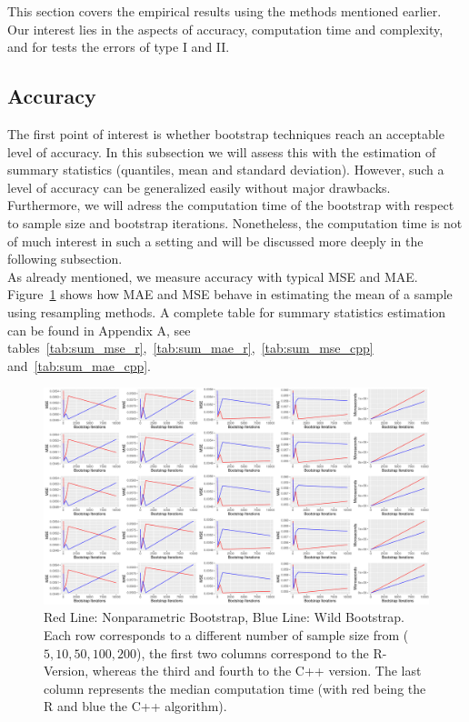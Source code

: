 This section covers the empirical results using the methods mentioned earlier. Our interest lies in the aspects of accuracy, computation time and complexity, and for tests the errors of type I and II. 
\subsection{Accuracy}
The first point of interest is whether bootstrap techniques reach an acceptable level of accuracy. In this subsection we will assess this with the estimation of summary statistics (quantiles, mean and standard deviation). However, such a level of accuracy can be generalized easily without major drawbacks. Furthermore, we will adress the computation time of the bootstrap with respect to sample size and bootstrap iterations. Nonetheless, the computation time is not of much interest in such a setting and will be discussed more deeply in the following subsection. \\
As already mentioned, we measure accuracy with typical MSE and MAE. Figure~\ref{fig:summary} shows how MAE and MSE behave in estimating the mean of a sample using resampling methods. A complete table for summary statistics estimation can be found in Appendix A, see tables~\ref{tab:sum_mse_r},~\ref{tab:sum_mae_r},~\ref{tab:sum_mse_cpp} and~\ref{tab:sum_mae_cpp}. 

\begin{figure}
\centering
	\includegraphics[scale=0.4]{./figures/plot_summary.pdf}
	\caption[Summary MSE and MAE]{Red Line: Nonparametric Bootstrap, Blue Line: Wild Bootstrap. Each row corresponds to a different number of sample size from ($5, 10, 50, 100, 200$), the first two columns correspond to the R-Version, whereas the third and fourth to the C++ version. The last column represents the median computation time (with red being the R and blue the C++ algorithm).}
	\label{fig:summary}
\end{figure}

